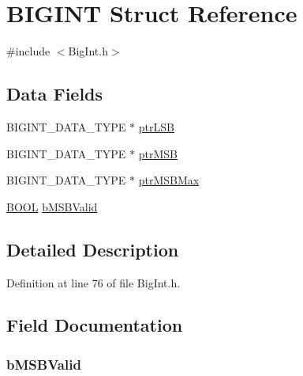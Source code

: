\hypertarget{struct_b_i_g_i_n_t}{}\section{B\+I\+G\+I\+N\+T Struct Reference}
\label{struct_b_i_g_i_n_t}


{\ttfamily \#include $<$Big\+Int.\+h$>$}

\subsection*{Data Fields}
\begin{DoxyCompactItemize}
\item 
B\+I\+G\+I\+N\+T\+\_\+\+D\+A\+T\+A\+\_\+\+T\+Y\+P\+E $\ast$ \hyperlink{struct_b_i_g_i_n_t_a144359039641b54326b266b7a4706341}{ptr\+L\+S\+B}
\item 
B\+I\+G\+I\+N\+T\+\_\+\+D\+A\+T\+A\+\_\+\+T\+Y\+P\+E $\ast$ \hyperlink{struct_b_i_g_i_n_t_ae84fcf922ad9a2c86106cb370a2cde11}{ptr\+M\+S\+B}
\item 
B\+I\+G\+I\+N\+T\+\_\+\+D\+A\+T\+A\+\_\+\+T\+Y\+P\+E $\ast$ \hyperlink{struct_b_i_g_i_n_t_a0ac0ae49e5682784ac4fd57099abd1e2}{ptr\+M\+S\+B\+Max}
\item 
\hyperlink{_generic_type_defs_8h_a54d65c7fa62e62c9754371e42f5111b9}{B\+O\+O\+L} \hyperlink{struct_b_i_g_i_n_t_aa2b1ee9c7124ea4e9e622a92edb656aa}{b\+M\+S\+B\+Valid}
\end{DoxyCompactItemize}


\subsection{Detailed Description}


Definition at line 76 of file Big\+Int.\+h.



\subsection{Field Documentation}
\hypertarget{struct_b_i_g_i_n_t_aa2b1ee9c7124ea4e9e622a92edb656aa}{}
\subsubsection[{b\+M\+S\+B\+Valid}]{ b\+M\+S\+B\+Valid}\label{struct_b_i_g_i_n_t_aa2b1ee9c7124ea4e9e622a92edb656aa}


